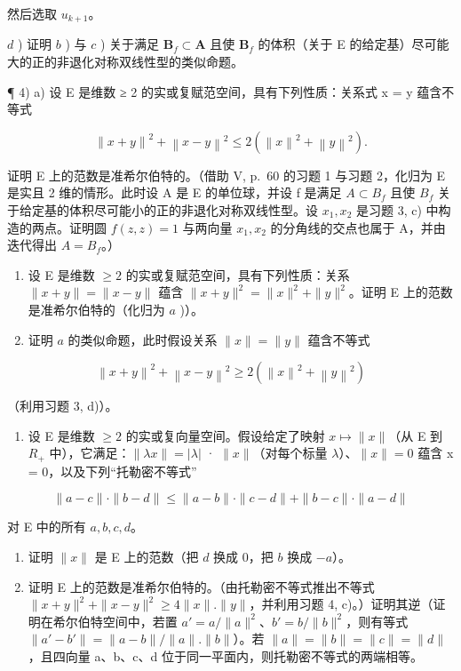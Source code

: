 然后选取 \(u_{k+1}\)。

\(d\) ) 证明 \(b\) ) 与 \(c\) ) 关于满足 \(\mathbf{B}_f\subset \mathbf{A}\) 且使 \(\mathbf{B}_f\) 的体积（关于 E 的给定基）尽可能大的正的非退化对称双线性型的类似命题。

¶ 4) a) 设 E 是维数 ≥ 2 的实或复赋范空间，具有下列性质：关系式 \textbar\textbar x\textbar\textbar{} = \textbar\textbar y\textbar\textbar{} 蕴含不等式

\[
\left\| x + y \right\| ^ {2} + \left\| x - y \right\| ^ {2} \leqslant 2 \left(\left\| x \right\| ^ {2} + \left\| y \right\| ^ {2}\right).
\]

证明 E 上的范数是准希尔伯特的。（借助 V, p.~60 的习题 1 与习题 2，化归为 E 是实且 2 维的情形。此时设 A 是 E 的单位球，并设 f 是满足 \(A \subset B_{f}\) 且使 \(B_{f}\) 关于给定基的体积尽可能小的正的非退化对称双线性型。设 \(x_{1}, x_{2}\) 是习题 3, c) 中构造的两点。证明圆 \(f(z, z) = 1\) 与两向量 \(x_{1}, x_{2}\) 的分角线的交点也属于 A，并由迭代得出 \(A = B_{f}\)。）

\begin{enumerate}
\def\labelenumi{\alph{enumi})}
\setcounter{enumi}{1}
\item
  设 E 是维数 \(\geqslant 2\) 的实或复赋范空间，具有下列性质：关系 \(\| x + y \| = \| x - y \|\) 蕴含 \(\| x + y \|^2 = \| x \|^2 + \| y \|^2\)。证明 E 上的范数是准希尔伯特的（化归为 \(a\) )）。
\item
  证明 \(a\) 的类似命题，此时假设关系 \(\| x\| = \| y\|\) 蕴含不等式
\end{enumerate}

\[
\left\| x + y \right\| ^ {2} + \left\| x - y \right\| ^ {2} \geqslant 2 \left(\left\| x \right\| ^ {2} + \left\| y \right\| ^ {2}\right)
\]

（利用习题 3, d)）。

\begin{enumerate}
\def\labelenumi{\arabic{enumi})}
\setcounter{enumi}{4}
\tightlist
\item
  设 E 是维数 \(\geqslant 2\) 的实或复向量空间。假设给定了映射 \(x \mapsto \|x\|\)（从 E 到 \(R_{+}\) 中），它满足：\(\|\lambda x\| = |\lambda|\) · \(\|x\|\)（对每个标量 \(\lambda\)）、\(\|x\| = 0\) 蕴含 x = 0，以及下列“托勒密不等式”
\end{enumerate}

\[
\| a - c \| \cdot \| b - d \| \leqslant \| a - b \| \cdot \| c - d \| + \| b - c \| \cdot \| a - d \|
\]

对 E 中的所有 \(a, b, c, d\)。

\begin{enumerate}
\def\labelenumi{\alph{enumi})}
\item
  证明 \(\| x\|\) 是 E 上的范数（把 \(d\) 换成 0，把 \(b\) 换成 \(-a\)）。
\item
  证明 E 上的范数是准希尔伯特的。（由托勒密不等式推出不等式 \(\|x+y\|^{2}+\|x-y\|^{2}\geqslant4\|x\|. \|y\|\)，并利用习题 4, c)。）证明其逆（证明在希尔伯特空间中，若置 \(a' = a/\|a\|^{2}\)、\(b' = b/\|b\|^{2}\)，则有等式 \(\|a'-b'\|=\|a-b\|/\|a\|. \|b\|\)）。若 \(\|a\|=\|b\|=\|c\|=\|d\|\)，且四向量 a、b、c、d 位于同一平面内，则托勒密不等式的两端相等。
\end{enumerate}

